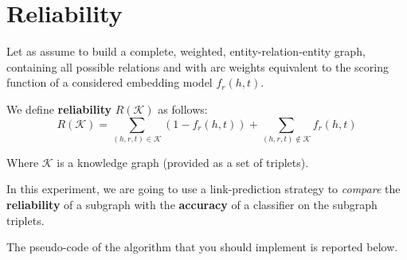 \documentclass[a4paper,9pt]{article}
\begin{document}

\section{Reliability}

Let as assume to build a complete, weighted, entity-relation-entity graph, containing all possible relations and with arc weights equivalent to the scoring function of a considered embedding model $f_r(h,t)$.

We define \textbf{reliability} $R(\mathcal{K})$ as follows: 
$$R(\mathcal{K}) = \sum_{(h,r,t) \in \mathcal{K}} (1 - f_r(h,t)) +  \sum_{(h,r,t) \not \in \mathcal{K}} f_r(h,t) $$

Where $\mathcal{K}$ is a knowledge graph (provided as a set of triplets). 

In this experiment, we are going to use a link-prediction strategy to \emph{compare} the \textbf{reliability} of a subgraph with the \textbf{accuracy} of a classifier on the subgraph triplets. 

The pseudo-code of the algorithm that you should implement is reported below. 
\end{document}
